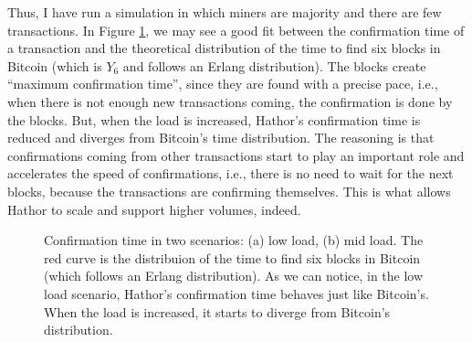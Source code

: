 Thus, I have run a simulation in which miners are majority and there are few transactions. In Figure \ref{fig:hathor-tct-low-mid}, we may see a good fit between the confirmation time of a transaction and the theoretical distribution of the time to find six blocks in Bitcoin (which is $Y_6$ and follows an Erlang distribution). The blocks create ``maximum confirmation time'', since they are found with a precise pace, i.e., when there is not enough new transactions coming, the confirmation is done by the blocks. But, when the load is increased, Hathor's confirmation time is reduced and diverges from Bitcoin's time distribution. The reasoning is that confirmations coming from other transactions start to play an important role and accelerates the speed of confirmations, i.e., there is no need to wait for the next blocks, because the transactions are confirming themselves. This is what allows Hathor to scale and support higher volumes, indeed.

\begin{figure}[!htb]
\centering
{}

\caption{Confirmation time in two scenarios: (a) low load, (b) mid load. The red curve is the distribuion of the time to find six blocks in Bitcoin (which follows an Erlang distribution). As we can notice, in the low load scenario, Hathor's confirmation time behaves just like Bitcoin's. When the load is increased, it starts to diverge from Bitcoin's distribution. \label{fig:hathor-tct-low-mid}}
\end{figure}

